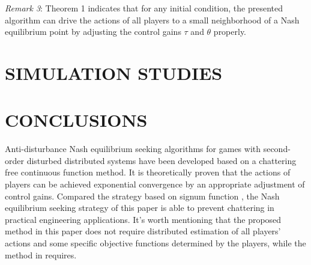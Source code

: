 \documentclass[lettersize,journal]{IEEEtran}
\begin{document}
\emph{Remark 3}: Theorem 1 indicates that for any initial condition, the presented algorithm can drive the actions of all players to a small neighborhood of a Nash equilibrium point by adjusting the control gains $\tau$ and $\theta$ properly.



\section{SIMULATION STUDIES}

\section{CONCLUSIONS}
Anti-disturbance Nash equilibrium seeking algorithms for games with second-order disturbed distributed systems have been developed based on a chattering free continuous function method. It is theoretically proven that the actions of players can be achieved exponential convergence by an appropriate adjustment of control gains. Compared the strategy based on signum function \cite{9696299}, the Nash equilibrium seeking strategy of this paper is able to prevent chattering in practical engineering applications. It's worth mentioning that the proposed method in this paper does not require distributed estimation of all players' actions and some specific objective functions determined by the players, while the method in \cite{8985536} requires.



\end{document}
